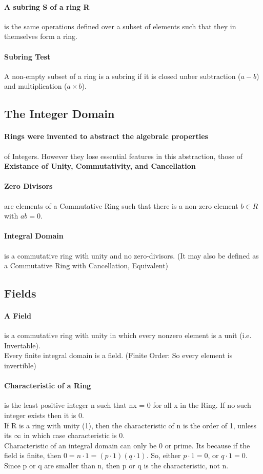 \paragraph{A subring S of a ring R} is the same operations defined over a subset of elements such that they in themselves form a ring.
\paragraph{Subring Test} A non-empty subset of a ring is a subring if it is closed unber subtraction ($a - b$) and multiplication ($a \times b$).


\subsection{The Integer Domain}

\paragraph{Rings were invented to abstract the algebraic properties} of Integers. However they lose essential features in this abstraction, those of \textbf{Existance of Unity, Commutativity, and Cancellation}
\paragraph{Zero Divisors} are elements of a Commutative Ring such that there is a non-zero element $b \in R$ with $ab = 0$.
\paragraph{Integral Domain} is a commutative ring with unity and no zero-divisors. (It may also be defined as a Commutative Ring with Cancellation, Equivalent)


\subsection{Fields}

\paragraph{A Field} is a commutative ring with unity in which every nonzero element is a unit (i.e. Invertable).
\\ Every finite integral domain is a field. (Finite Order: So every element is invertible)

\paragraph{Characteristic of a Ring} is the least positive integer n such that nx = 0 for all x in the Ring. If no such integer exists then it is 0.
\\ If R is a ring with unity (1), then the characteristic of n is the order of 1, unless its $\infty$ in which case characteristic is 0.
\\ Characteristic of an integral domain can only be 0 or prime. Its because if the field is finite, then $0 = n \cdot 1 = (p \cdot 1)(q \cdot 1)$. So, either $p \cdot 1 = 0$, or $q \cdot 1 = 0$. Since p or q are smaller than n, then p or q is the characteristic, not n.
